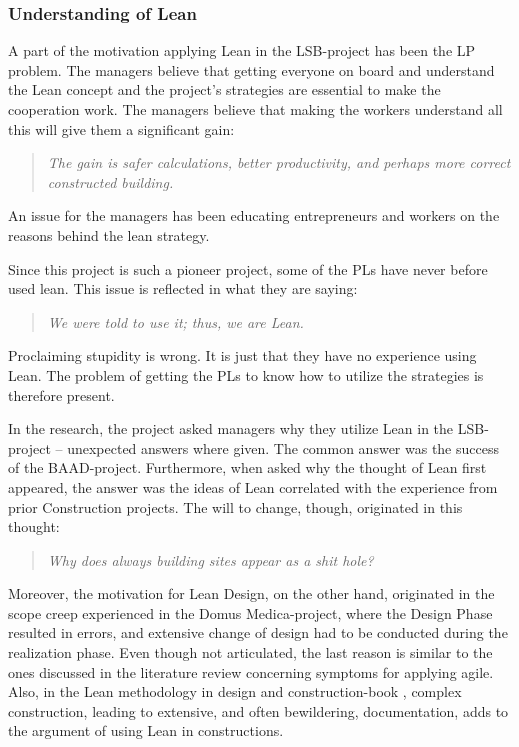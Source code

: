 \subsubsection{Understanding of Lean}
A part of the motivation applying Lean in the LSB-project has been the LP problem. The managers believe that getting everyone on board and understand the Lean concept and the project's strategies are essential to make the cooperation work. The managers believe that making the workers understand all this will give them a significant gain: 
\begin{quote}
 \textit{The gain is safer calculations, better productivity, and perhaps more correct constructed building.}
\end{quote}

An issue for the managers has been educating entrepreneurs and workers on the reasons behind the lean strategy.

Since this project is such a pioneer project, some of the PLs have never before used lean. This issue is reflected in what they are saying: 
\begin{quote}
 \textit{We were told to use it; thus, we are Lean.}
\end{quote}

Proclaiming stupidity is wrong. It is just that they have no experience using Lean. The problem of getting the PLs to know how to utilize the strategies is therefore present.

In the research, the project asked managers why they utilize Lean in the LSB-project – unexpected answers where given. The common answer was the success of the BAAD-project. Furthermore, when asked why the thought of Lean first appeared, the answer was the ideas of Lean correlated with the experience from prior Construction projects. The will to change, though, originated in this thought: 
\begin{quote}
 \textit{Why does always building sites appear as a shit hole?}
\end{quote}

Moreover, the motivation for Lean Design, on the other hand, originated in the scope creep experienced in the Domus Medica-project, where the Design Phase resulted in errors, and extensive change of design had to be conducted during the realization phase. Even though not articulated, the last reason is similar to the ones discussed in the literature review concerning symptoms for applying agile. Also, in the Lean methodology in design and construction-book \cite{lean_i_praksis}, complex construction, leading to extensive, and often bewildering, documentation, adds to the argument of using Lean in constructions. 


